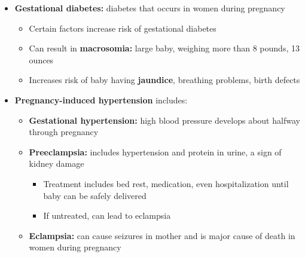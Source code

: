 \documentclass[12pt]{article}
\begin{document}
\begin{itemize}
                \item \textbf{Gestational diabetes:} diabetes that occurs in women during pregnancy
                    \begin{itemize}
                        \item Certain factors increase risk of gestational diabetes
                        \item Can result in \textbf{macrosomia:} large baby, weighing more than 8 pounds, 13 ounces
                        \item Increases risk of baby having \textbf{jaundice}, breathing problems, birth defects
                    \end{itemize}
                \item \textbf{Pregnancy-induced hypertension} includes:
                    \begin{itemize}
                        \item \textbf{Gestational hypertension:} high blood pressure develops about halfway through pregnancy
                        \item \textbf{Preeclampsia:} includes hypertension and protein in urine, a sign of kidney damage
                            \begin{itemize}
                                \item Treatment includes bed rest, medication, even hospitalization until baby can be safely delivered
                                \item If untreated, can lead to eclampsia
                            \end{itemize}
                        \item \textbf{Eclampsia:} can cause seizures in mother and is major cause of death in women during pregnancy
                    \end{itemize}
            \end{itemize}
\end{document}
